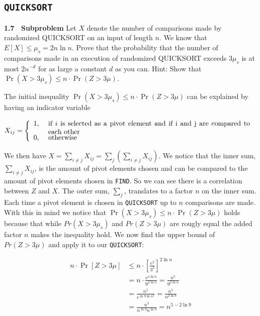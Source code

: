 \documentclass[article,a4paper,oneside]{article}
\newcommand{\+}[1]{\ensuremath{\boldsymbol{#1}}}
\begin{document}
\subsection*{\texttt{QUICKSORT}}

{\bf 1.7 \ Subproblem} Let $X$ denote the number of comparisons made by
randomized QUICKSORT on an input of length $n$. We know that $E[X]
\leq \mu_s= 2n\ln n$.  Prove that the probability that the number of
comparisons made in an execution of randomized QUICKSORT exceeds
$3\mu_s$ is at most $2n^{-d}$ for as large a constant $d$ as you can.
Hint: Show that $\Pr(X>3\mu_s)\leq n\cdot\Pr(Z>3\mu)$.

The initial inequality $\Pr(X>3\mu_s)\leq n\cdot\Pr(Z>3\mu)$ can be explained by having an indicator variable

$$X_{ij}=\left\{\begin{array}{ll}
1, & \mbox{
\begin{minipage}[t]{4in}
  if $i$ is selected as a pivot element and if i and j are compared to each other 
\end{minipage}
}
\\
0, & \mbox{ otherwise}
\end{array}\right.$$

We then have $X = \sum_{i \neq j} X_{ij} = \sum_j \left( \sum_{i \neq j} X_{ij} \right)$. We notice that the inner sum, $ \sum_{i \neq j} X_{ij}$, is the amount of pivot elements chosen and can be compared to the amount of pivot elements chosen in \texttt{FIND}. So we can see there is a correlation between $Z$ and $X$. The outer sum, $\sum_j$, translates to a factor $n$ on the inner sum. Each time a pivot element is chosen in \texttt{QUICKSORT} up to $n$ comparisons are made. With this in mind we notice that $\Pr(X>3\mu_s)\leq n\cdot\Pr(Z>3\mu)$ holds because that while $Pr(X > 3\mu_s)$ and $Pr(Z > 3\mu)$ are rougly equal the added factor $n$ makes the inequality hold. We now find the upper bound of $Pr(Z > 3\mu)$ and apply it to our \texttt{QUICKSORT}:

\begin{align*}
n\cdot \Pr[Z>3\mu] &\leq n\cdot \left [ \frac{e^2}{3^2} \right ]^{2\ln n}\\
&=n\cdot\frac{e^{4\ln n}}{9^{2\ln n}} =\frac{n^5}{9^{2\ln n}}\\
&=\frac{n^5}{e^{\ln 9 \ln n^2}} =\frac{n^5}{n^{2\ln 9}}\\
&=\frac{n^5}{n^{\ln 9}n^{\ln 9}} =n^{5-2\ln 9}
\end{align*}
\end{document}
